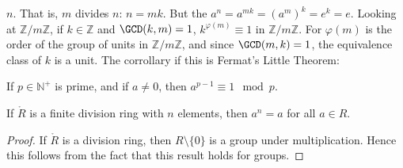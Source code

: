             $n$. That is, $m$ divides $n$: $n=mk$. But the
            $a^{n}=a^{mk}=(a^{m})^{k}=e^{k}=e$. Looking at
            $\mathbb{Z}/m\mathbb{Z}$, if $k\in\mathbb{Z}$ and
            $\GCD(k,m)=1$, $k^{\varphi(m)}\equiv{1}$ in
            $\mathbb{Z}/m\mathbb{Z}$. For $\varphi(m)$ is the order of the
            group of units in $\mathbb{Z}/m\mathbb{Z}$, and since
            $\GCD(m,k)=1$, the equivalence class of $k$ is a unit. The
            corrollary if this is Fermat's Little Theorem:
            \begin{theorem}
                If $p\in\mathbb{N}^{+}$ is prime, and if $a\ne{0}$, then
                $a^{p-1}\equiv{1}\mod{p}$.
            \end{theorem}
            \begin{theorem}
                If $\ring{R}$ is a finite division ring with $n$ elements,
                then $a^{n}=a$ for all $a\in{R}$.
            \end{theorem}
            \begin{proof}
                If $\ring{R}$ is a division ring, then $R\setminus\{0\}$ is
                a group under multiplication. Hence this follows from the
                fact that this result holds for groups.
            \end{proof}

